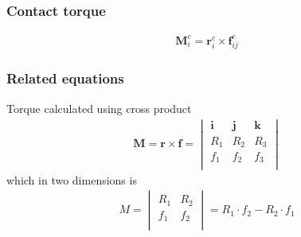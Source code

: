 \subsubsection{Contact torque}
\begin{align}
\mathbf{M}_{i}^{c} = \mathbf{r}_{i}^{c} \times \mathbf{f}_{ij}^{c}
\end{align}

\subsubsection{Related equations}
Torque calculated using cross product
\begin{align}
\mathbf{M} = \mathbf{r} \times \mathbf{f} =  \begin{vmatrix} \mathbf{i} & \mathbf{j} & \mathbf{k} \\ R_{1} & R_{2} & R_{3} \\ f_{1} & f_{2} & f_{3} \\ \end{vmatrix} 
\end{align}
which in two dimensions is
\begin{align}
M = \begin{vmatrix} R_{1} & R_{2} \\ f_{1} & f_{2} \\ \end{vmatrix} = R_{1} \cdot f_{2} - R_{2} \cdot f_{1}
\end{align}